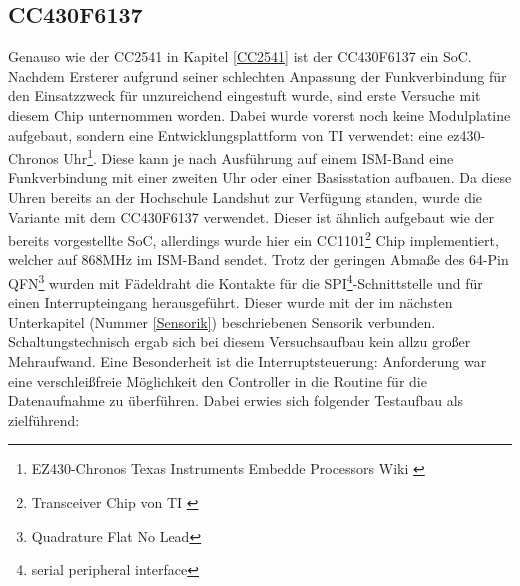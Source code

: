\documentclass[12pt]{scrreprt} %
\begin{document}
\subsection{CC430F6137}
Genauso wie der CC2541 in Kapitel \vref{CC2541} ist der CC430F6137 ein SoC. Nachdem Ersterer aufgrund seiner schlechten Anpassung der Funkverbindung für den Einsatzzweck für unzureichend eingestuft wurde, sind erste Versuche mit diesem Chip unternommen worden. Dabei wurde vorerst noch keine Modulplatine aufgebaut, sondern eine Entwicklungsplattform von TI verwendet: eine ez430-Chronos Uhr\footnote{EZ430-Chronos Texas Instruments Embedde Processors Wiki \citep{ez430}}. Diese kann je nach Ausführung auf einem ISM-Band eine Funkverbindung mit einer zweiten Uhr oder einer Basisstation aufbauen. Da diese Uhren bereits an der Hochschule Landshut zur Verfügung standen, wurde die Variante mit dem CC430F6137 verwendet.  Dieser ist ähnlich aufgebaut wie der bereits vorgestellte SoC, allerdings wurde hier ein CC1101\footnote{Transceiver Chip von TI \citep{cc1101}} Chip implementiert, welcher auf 868MHz im ISM-Band sendet. Trotz der geringen Abmaße des 64-Pin QFN\footnote{Quadrature Flat No Lead} wurden mit Fädeldraht die Kontakte für die SPI\footnote{serial peripheral interface}-Schnittstelle und für einen Interrupteingang herausgeführt. Dieser wurde mit der im nächsten Unterkapitel (Nummer \vref{Sensorik}) beschriebenen Sensorik verbunden. Schaltungstechnisch ergab sich bei diesem Versuchsaufbau kein allzu großer Mehraufwand. Eine Besonderheit ist die Interruptsteuerung: Anforderung war eine verschleißfreie Möglichkeit den Controller in die Routine für die Datenaufnahme zu überführen. Dabei erwies sich folgender Testaufbau als zielführend:
\end{document}
